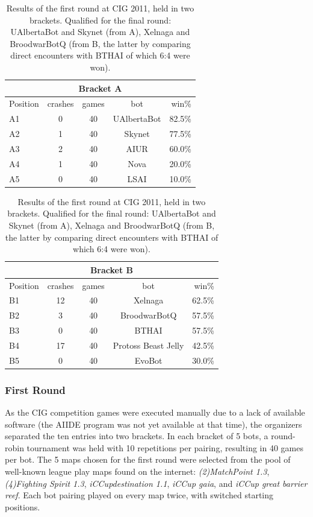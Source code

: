 \documentclass[journal]{IEEEtran}
\begin{document}
\begin{table}[t!]
\caption{Results of the first round at CIG 2011, held in two brackets.
Qualified for the final round: UAlbertaBot and Skynet (from A), Xelnaga
and BroodwarBotQ (from B, the latter by comparing direct encounters
with BTHAI of which 6:4 were won).}
\label{tab:cig-first-round}
\begin{small}
\begin{center}
\begin{tabular}{|l|c|c|c|r|}
\hline
\multicolumn{5}{|c|}{Bracket A} \\ \hline
Position & crashes & games & bot	& win\%\\ \hline
A1 & 0 &	 40 &	 UAlbertaBot & 82.5\% \\
A2 & 1 &  	 40 &	 Skynet	  &  77.5\% \\
A3 & 2 &	 40 &	 AIUR	  &  60.0\% \\
A4 & 1 &	 40 &	 Nova	  &  20.0\% \\
A5 & 0 &	 40 &	 LSAI	  &  10.0\%\\
\hline
\end{tabular}
\begin{tabular}{|l|c|c|c|r|}
\hline
\multicolumn{5}{|c|}{Bracket B} \\ \hline
Position & crashes & games & bot	& win\%\\ \hline
B1 & 12 &	 40 &	 Xelnaga &	 62.5\%\\
B2 & 3 &   40 &	 BroodwarBotQ  &  57.5\%\\
B3 & 0 &	 40 &	 BTHAI	  &  57.5\%\\
B4 & 17 &	 40 &	 Protoss Beast Jelly  & 42.5\%\\
B5 & 0 &	 40 &	 EvoBot	  &  30.0\%\\
\hline
\end{tabular}
\end{center}
\end{small}
\end{table}

\subsubsection{First Round}
\label{sec:cig-first-round}

As the CIG competition games were executed manually due to
a lack of available software (the AIIDE program was not yet
available at that time), the organizers separated the ten entries into
two brackets. In each bracket of 5 bots, a round-robin
tournament was held with 10 repetitions per pairing, resulting
in 40 games per bot.
The 5 maps chosen for the first round were selected from the pool
of well-known league play maps found on the internet:
\emph{(2)MatchPoint 1.3}, \emph{(4)Fighting Spirit 1.3}, 
\emph{iCCupdestination 1.1}, \emph{iCCup gaia}, and 
\emph{iCCup great barrier reef}. Each bot pairing played
on every map twice, with switched starting positions.
\end{document}
